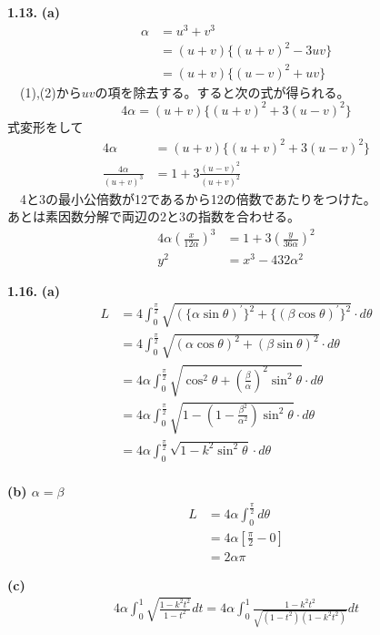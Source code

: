 \documentclass [15pt,titlepage]{jarticle}
\begin{document}
\begin{comment}
演習問題(1.13)
\end{comment}
\textbf{1.13.}
\textbf{(a)}
\begin{align*}
	\alpha	&=u^3+v^3						\\
			&=(u+v)\{(u+v)^2-3uv\}		\tag{1}	\\
			&=(u+v)\{(u-v)^2+uv\}		\tag{2}				
\end{align*}
　(1),(2)から$uv$の項を除去する。すると次の式が得られる。
\begin{equation*}
	4\alpha=(u+v)\{(u+v)^2+3(u-v)^2\}
\end{equation*}
式変形をして
\begin{align*}
	4\alpha		&=(u+v)\{(u+v)^2+3(u-v)^2\}\\
	\frac{4\alpha}{(u+v)^3}
				&=1+3\frac{(u-v)^2}{(u+v)^2}
\end{align*}
　4と3の最小公倍数が12であるから12の倍数であたりをつけた。\\
あとは素因数分解で両辺の2と3の指数を合わせる。
\begin{align*}			
	4\alpha
	\left(\frac{x}{12\alpha}\right)^3		
				&=1+3\left(\frac{y}{36\alpha}\right)^2	\\
	 y^2			&=x^3-432\alpha^2			
\end{align*}

\newpage
\begin{comment}
演習問題(1.16)
\end{comment}
\textbf{1.16.}
\textbf{(a)}
\begin{align*}
L
	&=4\int^\frac{\pi}{2}_0
		\sqrt{
			(\{\alpha\sin\theta)^{\prime}\}^2+\{(\beta\cos\theta)^{\prime}\}^2
			}\cdot d\theta\\
	&=4\int^\frac{\pi}{2}_0
		\sqrt{
			(\alpha\cos\theta)^2+(\beta\sin\theta)^2
			}\cdot d\theta\\
	&=4\alpha\int^\frac{\pi}{2}_0\sqrt{
			\cos^2\theta+\left(\frac{\beta}{\alpha}\right)^2\sin^2\theta
				}\cdot d\theta\\
	&=4\alpha\int^\frac{\pi}{2}_0\sqrt{1-\left(1-\frac{\beta^2}{\alpha^2}\right)\sin^2\theta
				}\cdot d\theta\\
	&=4\alpha\int^\frac{\pi}{2}_0\sqrt{1-k^2\sin^2\theta}\cdot d\theta\\
\end{align*}


\textbf{(b)
$\alpha=\beta$}
\begin{align*}
\displaystyle
L
	&=4\alpha\int^\frac{\pi}{2}_0 d\theta\\
	&=4\alpha\left[\frac{\pi}{2}-0\right]\\
	&=2\alpha\pi
\end{align*}


\textbf{(c)}
\begin{align*}
\displaystyle
4\alpha\int^1_0\sqrt{\frac{1-k^2t^2}{1-t^2}}dt=4\alpha\int^1_0\frac{1-k^2t^2}{\sqrt{(1-t^2)(1-k^2t^2)}}dt
\end{align*}
　
\end{document}
